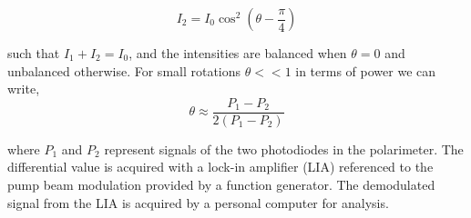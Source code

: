 \begin{equation}
I_2 = I_0 \cos^2(\theta-\frac{\pi}{4})   
\end{equation}

such that $I_1 + I_2 = I_0$, and the intensities are balanced when $\theta = 0$ and unbalanced otherwise. 
For small rotations $\theta << 1$ in terms of power we can write,
\begin{equation}
  \theta \approx \frac{P_1-P_2}{2(P_1-P_2)}  
\end{equation}

where $P_1$ and $P_2$ represent signals of the two photodiodes in the polarimeter. The differential value is acquired with a lock-in amplifier (LIA) referenced to the pump beam modulation provided by a function generator. The demodulated signal from the LIA is acquired by a personal computer for analysis. 

